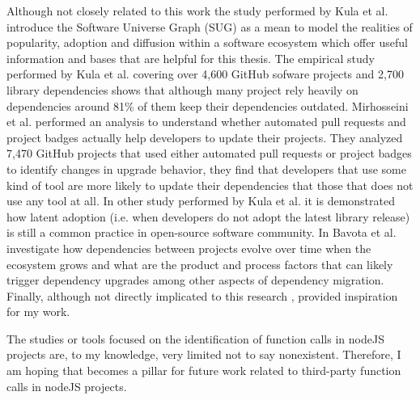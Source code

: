 Although not closely related to this work the study performed by Kula et al. \cite{kula2018generalized} introduce the Software Universe Graph (SUG) as a mean to model the realities of popularity, adoption and diffusion within a software ecosystem which offer useful information and bases that are helpful for this thesis. The empirical study performed by Kula et al. \cite{Kula:2018} covering over 4,600 GitHub sofware projects and 2,700 library dependencies shows that although many project rely heavily on dependencies around 81\% of them keep their dependencies outdated. Mirhosseini et al. \cite{Mirhosseini:2017} performed an analysis to understand whether automated pull requests and project badges actually help developers to update their projects. They analyzed 7,470 GitHub projects that used either automated pull requests or project badges to identify changes in upgrade behavior, they find that developers that use some kind of tool are more likely to update their dependencies that those that does not use any tool at all. In other study performed by Kula et al. \cite{Kula:2015} it is demonstrated how latent adoption (i.e. when developers do not adopt the latest library release) is still a common practice in open-source software community. In \cite{bavota2015apache} Bavota et al. investigate how dependencies between projects evolve over time when the ecosystem grows and what are the product and process factors that can likely trigger dependency upgrades among other aspects of dependency migration.
Finally, although not directly implicated to this research \cite{plate2015impact,landman2017challenges,alqahtani2016tracing,cadariu2015tracking,xia2014studying,ruiz2015beyond}, provided inspiration for my work.

The studies or tools focused on the identification of function calls in nodeJS projects are, to my knowledge, very limited not to say nonexistent. Therefore, I am hoping that \tool[] becomes a pillar for future work related to third-party function calls in nodeJS projects.
